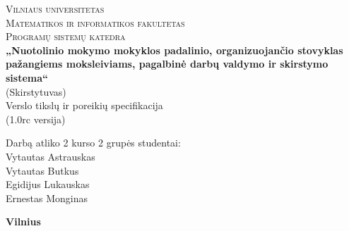 \begin{titlepage}

  \begin{center}

    \textsc{\Large Vilniaus universitetas\\
    Matematikos ir informatikos fakultetas\\
    Programų sistemų katedra}\\[6.0cm]

    \textbf{ \LARGE „Nuotolinio mokymo mokyklos padalinio, 
    organizuojančio stovyklas pažangiems moksleiviams, pagalbinė darbų 
    valdymo ir skirstymo sistema“ }\\
    { \Large (Skirstytuvas)}\\[0.5cm]

    {\Large Verslo tikslų ir poreikių specifikacija }\\[0.5cm]

    {\Large (1.0rc versija)}\\[3.0cm]

    \begin{minipage}[]{0.8\textwidth}
      \begin{flushright} 
        Darbą atliko 2 kurso 2 grupės studentai: \\
        Vytautas Astrauskas \\
        Vytautas Butkus \\
        Egidijus Lukauskas \\
        Ernestas Monginas
      \end{flushright}
    \end{minipage}

    \vfill

    \textbf{\large  Vilnius \\ \the\year }
  \end{center}
  
\end{titlepage}
